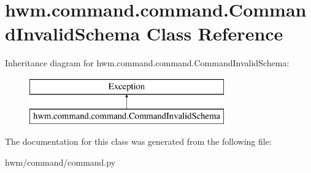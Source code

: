\hypertarget{classhwm_1_1command_1_1command_1_1_command_invalid_schema}{\section{hwm.\-command.\-command.\-Command\-Invalid\-Schema Class Reference}
\label{classhwm_1_1command_1_1command_1_1_command_invalid_schema}
}
Inheritance diagram for hwm.\-command.\-command.\-Command\-Invalid\-Schema\-:\begin{figure}[H]
\begin{center}
\leavevmode
\includegraphics[height=2.000000cm]{classhwm_1_1command_1_1command_1_1_command_invalid_schema}
\end{center}
\end{figure}


The documentation for this class was generated from the following file\-:\begin{DoxyCompactItemize}
\item 
hwm/command/command.\-py\end{DoxyCompactItemize}
